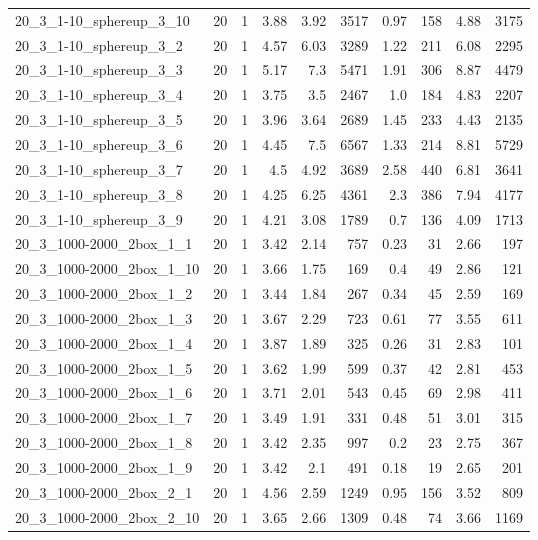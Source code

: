 \begin{center}
\begin{scriptsize}
\begin{longtable}{lrrrrrrrrr}
20\_3\_1-10\_sphereup\_3\_10 & 20 & 1 & 3.88 & 3.92 & 3517 & 0.97 & 158 & 4.88 & 3175\\
20\_3\_1-10\_sphereup\_3\_2 & 20 & 1 & 4.57 & 6.03 & 3289 & 1.22 & 211 & 6.08 & 2295\\
20\_3\_1-10\_sphereup\_3\_3 & 20 & 1 & 5.17 & 7.3 & 5471 & 1.91 & 306 & 8.87 & 4479\\
20\_3\_1-10\_sphereup\_3\_4 & 20 & 1 & 3.75 & 3.5 & 2467 & 1.0 & 184 & 4.83 & 2207\\
20\_3\_1-10\_sphereup\_3\_5 & 20 & 1 & 3.96 & 3.64 & 2689 & 1.45 & 233 & 4.43 & 2135\\
20\_3\_1-10\_sphereup\_3\_6 & 20 & 1 & 4.45 & 7.5 & 6567 & 1.33 & 214 & 8.81 & 5729\\
20\_3\_1-10\_sphereup\_3\_7 & 20 & 1 & 4.5 & 4.92 & 3689 & 2.58 & 440 & 6.81 & 3641\\
20\_3\_1-10\_sphereup\_3\_8 & 20 & 1 & 4.25 & 6.25 & 4361 & 2.3 & 386 & 7.94 & 4177\\
20\_3\_1-10\_sphereup\_3\_9 & 20 & 1 & 4.21 & 3.08 & 1789 & 0.7 & 136 & 4.09 & 1713\\
20\_3\_1000-2000\_2box\_1\_1 & 20 & 1 & 3.42 & 2.14 & 757 & 0.23 & 31 & 2.66 & 197\\
20\_3\_1000-2000\_2box\_1\_10 & 20 & 1 & 3.66 & 1.75 & 169 & 0.4 & 49 & 2.86 & 121\\
20\_3\_1000-2000\_2box\_1\_2 & 20 & 1 & 3.44 & 1.84 & 267 & 0.34 & 45 & 2.59 & 169\\
20\_3\_1000-2000\_2box\_1\_3 & 20 & 1 & 3.67 & 2.29 & 723 & 0.61 & 77 & 3.55 & 611\\
20\_3\_1000-2000\_2box\_1\_4 & 20 & 1 & 3.87 & 1.89 & 325 & 0.26 & 31 & 2.83 & 101\\
20\_3\_1000-2000\_2box\_1\_5 & 20 & 1 & 3.62 & 1.99 & 599 & 0.37 & 42 & 2.81 & 453\\
20\_3\_1000-2000\_2box\_1\_6 & 20 & 1 & 3.71 & 2.01 & 543 & 0.45 & 69 & 2.98 & 411\\
20\_3\_1000-2000\_2box\_1\_7 & 20 & 1 & 3.49 & 1.91 & 331 & 0.48 & 51 & 3.01 & 315\\
20\_3\_1000-2000\_2box\_1\_8 & 20 & 1 & 3.42 & 2.35 & 997 & 0.2 & 23 & 2.75 & 367\\
20\_3\_1000-2000\_2box\_1\_9 & 20 & 1 & 3.42 & 2.1 & 491 & 0.18 & 19 & 2.65 & 201\\
20\_3\_1000-2000\_2box\_2\_1 & 20 & 1 & 4.56 & 2.59 & 1249 & 0.95 & 156 & 3.52 & 809\\
20\_3\_1000-2000\_2box\_2\_10 & 20 & 1 & 3.65 & 2.66 & 1309 & 0.48 & 74 & 3.66 & 1169\\

\end{longtable}
\end{scriptsize}
\end{center}
